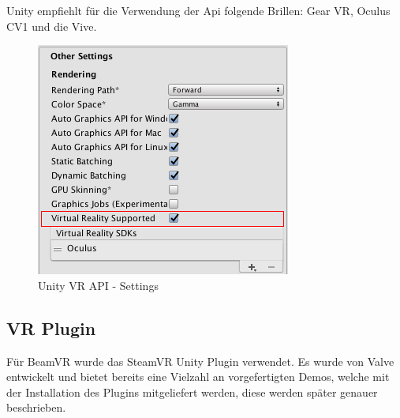 \begin{itemize}
Unity empfiehlt für die Verwendung der Api folgende Brillen: Gear VR, Oculus CV1 und die Vive.
~\cite{Unity_VR_Overview_2022}

\begin {figure}
    \centering
    \includegraphics[scale=0.8]{pics/unity_basis_vr_api_settings}
    \caption{Unity VR API - Settings}
    \label{fig:unity_vr_api_settings}
\end {figure}

\subsection{VR Plugin}
Für BeamVR wurde das SteamVR Unity Plugin verwendet.
Es wurde von Valve entwickelt und bietet bereits eine Vielzahl an vorgefertigten Demos, welche mit der Installation des Plugins mitgeliefert werden, diese werden später genauer beschrieben.
~\cite{SteamVR_Overview_2022}


\end{itemize}
